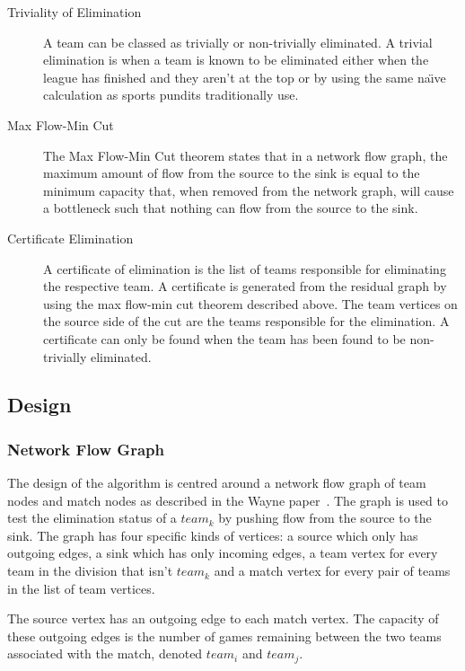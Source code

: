 \begin{description}
\item[Triviality of Elimination] A team can be classed as trivially or
non-trivially eliminated. A trivial elimination is when a team is known to be
eliminated either when the league has finished and they aren't at the top or
by using the same na\"{\i}ve calculation as sports pundits traditionally
use.

\item[Max Flow-Min Cut] The Max Flow-Min Cut theorem states that in a network
flow graph, the maximum amount of flow from the source to the sink is equal
to the minimum capacity that, when removed from the network graph, will
cause a bottleneck such that nothing can flow from the source to the sink.

\item[Certificate Elimination] A certificate of elimination is the list of
teams responsible for eliminating the respective team. A certificate is
generated from the residual graph by using the max flow-min cut theorem
described above. The team vertices on the source side of the cut are the
teams responsible for the elimination. A certificate can only be found when
the team has been found to be non-trivially eliminated.

\end{description}

\subsection{Design}

\subsubsection{Network Flow Graph}

The design of the algorithm is centred around a network flow graph of
team nodes and match nodes as described in the Wayne
paper~\cite{Wayne}. The graph is used to test the elimination status of a
$team_k$ by pushing flow from the source to the sink. The graph has four
specific kinds of vertices: a source which only has outgoing edges,
a sink which has only incoming edges, a team vertex for every team in the
division that isn't $team_k$ and a match vertex for every pair
of teams in the list of team vertices.

The source vertex has an outgoing edge to each match vertex.
The capacity of these outgoing edges is the number of games remaining between
the two teams associated with the match, denoted $team_i$ and $team_j$.

